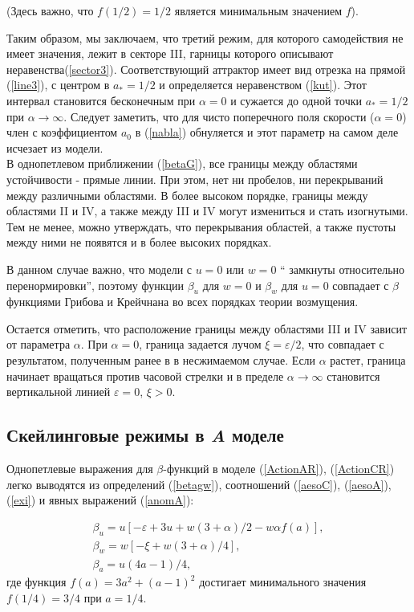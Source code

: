\documentclass[a4paper,10pt]{article}
\begin{document}
(Здесь важно, что $f(1/2)=1/2$  является минимальным значением $f$).

Таким образом, мы заключаем, что третий режим, для которого самодействия не имеет значения, лежит в секторе III, гарницы которого описывают неравенства(\ref{sector3}).
Соответствующий аттрактор имеет вид отрезка на прямой  (\ref{line3}), с центром в $a_{*}=1/2$  и определяется неравенством (\ref{kut}).
Этот интервал становится бесконечным при $\alpha=0$ и сужается до одной точки  $a_{*}=1/2$ при $\alpha\to\infty$.
Следует заметить, что для чисто поперечного поля скорости ($\alpha=0$) член с коэффициентом $a_{0}$ в (\ref{nabla}) обнуляется и этот параметр на самом деле исчезает из модели.\\

В однопетлевом приближении (\ref{betaG}), все границы между областями устойчивости - прямые линии. При этом, нет ни пробелов, ни перекрываний между различными областями.
В более высоком порядке, границы между областями II и IV, а также между III и IV могут измениться и стать изогнутыми.
Тем не менее, можно утверждать, что перекрывания областей, а также пустоты между ними не появятся и в более высоких порядках.

В данном случае важно, что модели с $u=0$  или  $w=0$  `` замкнуты относительно перенормировки'', поэтому функции $\beta_{u}$
для  $w=0$ и $\beta_{w}$ для $u=0$  совпадает с  $\beta$  функциями Грибова и Крейчнана во всех порядках теории возмущения.

Остается отметить, что расположение границы между областями III и IV зависит от параметра $\alpha$.
При $\alpha=0$, граница задается лучом $\xi=\varepsilon/2$, что совпадает с результатом, полученным ранее в \cite{AIK} в несжимаемом случае.
Если  $\alpha$ растет, граница начинает вращаться против часовой стрелки и в пределе $\alpha\to\infty$ становится вертикальной линией $\varepsilon=0$, $\xi>0$.

\subsection{Скейлинговые режимы в {\it A} моделе} \label{sec:GPA}


Однопетлевые выражения для $\beta$-функций в моделе (\ref{ActionAR}), (\ref{ActionCR}) легко выводятся из определений
(\ref{betagw}), соотношений  (\ref{aesoC}), (\ref{aesoA}), (\ref{exi}) и явных выражений (\ref{anomA}):

\begin{eqnarray}
\beta_{u} = u \left[ -\varepsilon+ 3u + w(3+\alpha)/2 -w\alpha f(a) \right],
\nonumber \\
\beta_{w} = w \left[ -\xi + w(3+\alpha)/4 \right],
\nonumber \\
\beta_{a} = u(4a-1)/4,
\label{betaA}
\end{eqnarray}
где функция $f(a)=3a^{2}+(a-1)^{2}$ достигает минимального значения
$f(1/4) =3/4$ при $a=1/4$.
\end{document}
